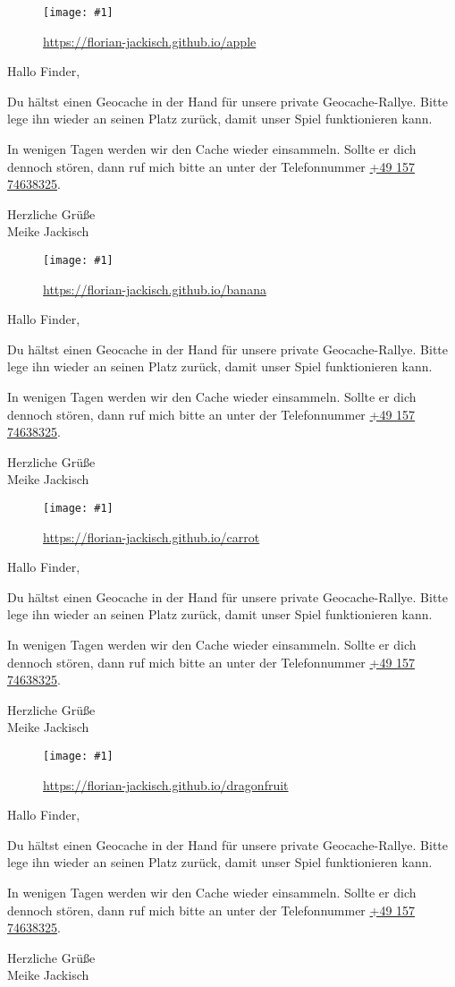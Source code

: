 \documentclass[a4paper,oneside]{article}
\newcommand{\myQRCodes}[2]{
        \begin{minipage}[t][7cm][b]{7cm}
        \begin{figure}[H]
            \centering
            \texttt{[image: \#1]}
            \caption*{\url{#2}}
        \end{figure}
        \end{minipage}
}
\newcommand{\explanation}{
        \setlength{\skip0}{\parskip}
        \begin{minipage}[t][7cm][c]{7cm}
        \setlength\parskip{\skip0}
Hallo Finder,

Du hältst einen Geocache in der Hand für unsere private Geocache-Rallye.
Bitte lege ihn wieder an seinen Platz zurück, damit unser Spiel funktionieren kann.

In wenigen Tagen werden wir den Cache wieder einsammeln.
Sollte er dich dennoch stören, dann ruf mich bitte an unter der Telefonnummer \href{tel:+49 157 74638325}{+49 157 74638325}.

Herzliche Grüße\\
Meike Jackisch
        \end{minipage}
}
\begin{document}

\myQRCodes{apple.png}{https://florian-jackisch.github.io/apple}
\explanation

\myQRCodes{banana.png}{https://florian-jackisch.github.io/banana}
\explanation

\myQRCodes{carrot.png}{https://florian-jackisch.github.io/carrot}
\explanation

\myQRCodes{dragonfruit.png}{https://florian-jackisch.github.io/dragonfruit}
\explanation
\end{document}
